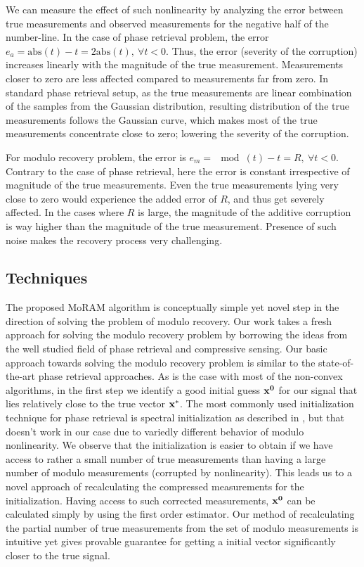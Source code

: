 We can measure the effect of such nonlinearity by analyzing the error between true measurements and observed measurements for the negative half of the number-line. In the case of phase retrieval problem, the error $e_a = \mathrm{abs}(t) - t = 2\mathrm{abs}(t),~\forall t <0$. Thus, the error (severity of the corruption) increases linearly with the magnitude of the true measurement. Measurements closer to zero are less affected compared to measurements far from zero. In standard phase retrieval setup, as the true measurements are linear combination of the samples from the Gaussian distribution, resulting distribution of the true measurements follows the Gaussian curve, which makes most of the true measurements concentrate close to zero; lowering the severity of the corruption.

For modulo recovery problem, the error is $e_m = \mod(t)-t = R,~\forall t<0$. Contrary to the case of phase retrieval, here the error is constant irrespective of magnitude of the true measurements. Even the true measurements lying very close to zero would experience the added error of $R$, and thus get severely affected. In the cases where $R$ is large, the magnitude of the additive corruption is way higher than the magnitude of the true measurement. Presence of such noise makes the recovery process very challenging.
\subsection{Techniques}

The proposed MoRAM algorithm is conceptually simple yet novel step in the direction of solving the problem of modulo recovery. Our work takes a fresh approach for solving the modulo recovery problem by borrowing the ideas from the well studied field of phase retrieval and compressive sensing. Our basic approach towards solving the modulo recovery problem is similar to the state-of-the-art phase retrieval approaches. As is the case with most of the non-convex algorithms, in the first step we identify a good initial guess $\mathbf{x^0}$ for our signal that lies relatively close to the true vector $\mathbf{x^*}$. The most commonly used initialization technique for phase retrieval is spectral initialization as described in \cite{Netrapalli2013}, but that doesn't work in our case due to variedly different behavior of modulo nonlinearity. We observe that the initialization is easier to obtain if we have access to rather a small number of true measurements than having a large number of modulo measurements (corrupted by nonlinearity). This leads us to a novel approach of recalculating the compressed measurements for the initialization. Having access to such corrected measurements, $\mathbf{x^0}$ can be calculated simply by using the first order estimator. Our method of recalculating the partial number of true measurements from the set of modulo measurements is intuitive yet gives provable guarantee for getting a initial vector significantly closer to the true signal. 

